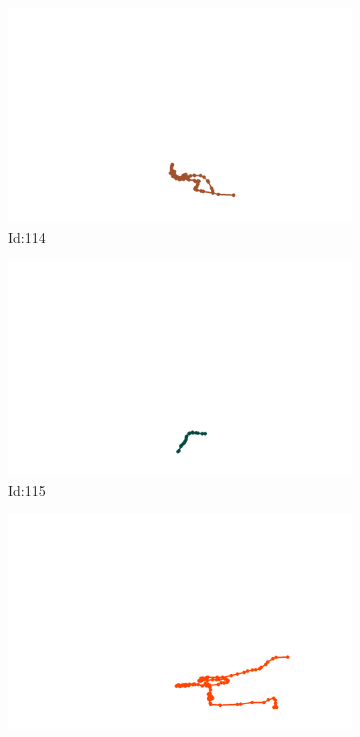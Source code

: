 \documentclass[12pt,twoside]{report}
\begin{document}
\begin{figure}
\centering
\begin{subfigure}[b]{0.20\textwidth}
\centering
\includegraphics[width=\textwidth]{../../trajectories/114.png}
\caption{Id:114}
\end{subfigure}
\begin{subfigure}[b]{0.20\textwidth}
\centering
\includegraphics[width=\textwidth]{../../trajectories/115.png}
\caption{Id:115}
\end{subfigure}
\begin{subfigure}[b]{0.20\textwidth}
\centering
\includegraphics[width=\textwidth]{../../trajectories/132.png}

\end{subfigure}
\end{figure}
\end{document}
